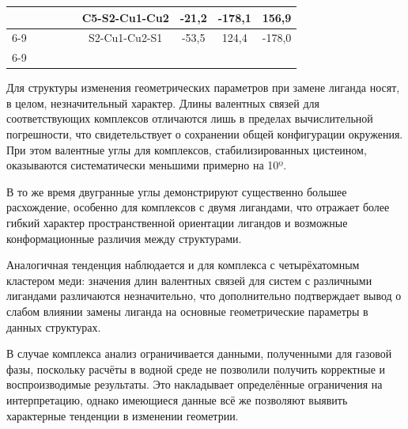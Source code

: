 \documentclass[a4paper,12pt]{article}
\begin{document}
\begin{onehalfspace}
\begin{table}[H]
\begin{tabular}{ccccc|cccc|}
			&                             &                            &                               &           & \multicolumn{1}{c|}{C5-S2-Cu1-Cu2} & \multicolumn{1}{c|}{-21,2}  & \multicolumn{1}{c|}{-178,1} & 156,9    \\ \cline{6-9} 
			&                             &                            &                               &           & \multicolumn{1}{c|}{S2-Cu1-Cu2-S1} & \multicolumn{1}{c|}{-53,5}  & \multicolumn{1}{c|}{124,4}  & -178,0   \\ \cline{6-9} 
		\end{tabular}
	\end{table}
	

	Для структуры  изменения геометрических параметров при замене лиганда носят, в целом, незначительный характер. Длины валентных связей для соответствующих комплексов отличаются лишь в пределах вычислительной погрешности, что свидетельствует о сохранении общей конфигурации окружения. При этом валентные углы для комплексов, стабилизированных цистеином, оказываются систематически меньшими примерно на 10º.

	В то же время двугранные углы демонстрируют существенно большее расхождение, особенно для комплексов с двумя лигандами, что отражает более гибкий характер пространственной ориентации лигандов и возможные конформационные различия между структурами.

	Аналогичная тенденция наблюдается и для комплекса с четырёхатомным кластером меди: значения длин валентных связей для систем с различными лигандами различаются незначительно, что дополнительно подтверждает вывод о слабом влиянии замены лиганда на основные геометрические параметры в данных структурах.
	
	В случае комплекса  анализ ограничивается данными, полученными для газовой фазы, поскольку расчёты в водной среде не позволили получить корректные и воспроизводимые результаты. Это накладывает определённые ограничения на интерпретацию, однако имеющиеся данные всё же позволяют выявить характерные тенденции в изменении геометрии.
	

\end{onehalfspace}
\end{document}
